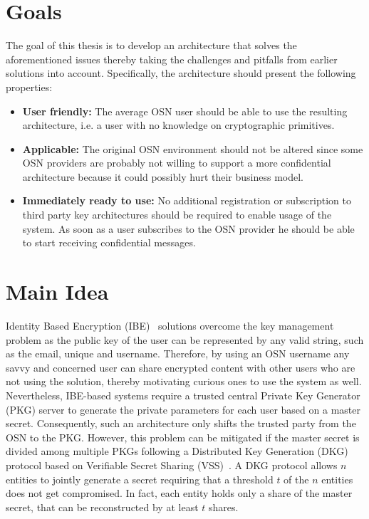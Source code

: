 \section{Goals}
\label{sec:goals_of_this_thesis}
The goal of this thesis is to develop an architecture that solves the aforementioned issues thereby taking the challenges and pitfalls from earlier solutions into account. Specifically, the architecture should present the following properties:
\begin{itemize}
 \item \textbf{User friendly:} The average OSN user should be able to use the resulting architecture, i.e. a user with no knowledge on cryptographic primitives.
 \item \textbf{Applicable:} The original OSN environment should not be altered since some OSN providers are probably not willing to support a more confidential architecture because it could possibly hurt their business model.
 \item \textbf{Immediately ready to use:} No additional registration or subscription to third party key architectures should be required to enable usage of the system. As soon as a user subscribes to the OSN provider he should be able to start receiving confidential messages.
\end{itemize}

\section{Main Idea}
Identity Based Encryption (IBE)~\cite{art:Shamir84} solutions overcome the key management problem as the public key of the user can be represented by any valid string, such as the email, unique \id{} and username. Therefore, by using an OSN username any savvy and concerned user can share encrypted content with other users who are not using the solution, thereby motivating curious ones to use the system as well. Nevertheless, IBE-based systems require a trusted central Private Key Generator (PKG) server to generate the private parameters for each user based on a master secret. Consequently, such an architecture only shifts the trusted party from the OSN to the PKG. However, this problem can be mitigated if the master secret is divided among multiple PKGs following a Distributed Key Generation (DKG)~\cite{art:Pedersen91a} protocol based on Verifiable Secret Sharing (VSS)~\cite{art:ChorGMA85}. A DKG protocol allows $n$ entities to jointly generate a secret requiring that a threshold $t$ of the $n$ entities does not get compromised. In fact, each entity holds only a share of the master secret, that can be reconstructed by at least $t$ shares. 

